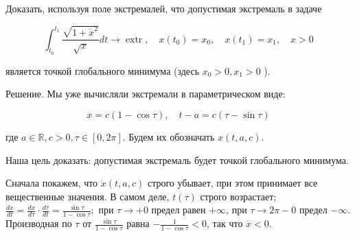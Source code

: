 \begin{task}
Доказать, используя поле экстремалей, что допустимая экстремаль в задаче

$$
\int_{t_{0}}^{t_{1}} \frac{\sqrt{1+\dot{x}^{2}}}{\sqrt{x}} d t \rightarrow \operatorname{extr}, \quad x\left(t_{0}\right)=x_{0}, \quad x\left(t_{1}\right)=x_{1}, \quad x>0
$$

является точкой глобального минимума (здесь $x_{0}>0, x_{1}>0$ ).

Решение. Мы уже вычисляли экстремали в параметрическом виде:

$$
x=c(1-\cos \tau), \quad t-a=c(\tau-\sin \tau)
$$

где $a \in \mathbb{R}, c>0, \tau \in[0,2 \pi]$. Будем их обозначать $x(t, a, c)$.

Наша цель доказать: допустимая экстремаль будет точкой глобального минимума.

Сначала покажем, что $\dot{x}(t, a, c)$ строго убывает, при этом принимает все вещественные значения. В самом деле, $t(\tau)$ строго возрастает; $\frac{d x}{d t}=\frac{d x}{d \tau} \cdot \frac{d \tau}{d t}=\frac{\sin \tau}{1-\cos \tau} ;$ при $\tau \rightarrow+0$ предел равен $+\infty$, при $\tau \rightarrow 2 \pi-0$ предел $-\infty$. Производная по $\tau$ от $\frac{\sin \tau}{1-\cos \tau}$ равна $-\frac{1}{1-\cos \tau}<0$, так что $\ddot{x}<0$.
\end{task}